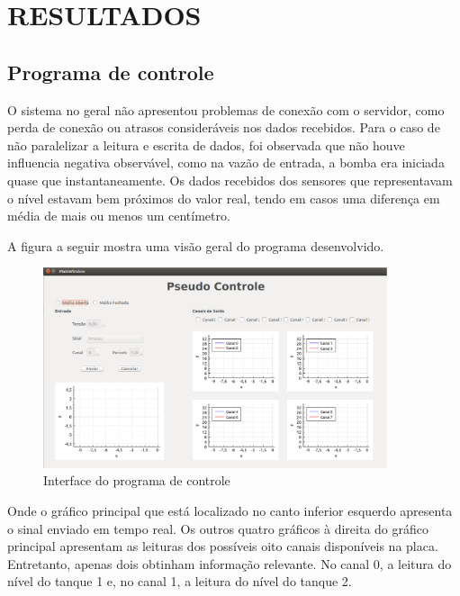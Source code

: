 \documentclass[a4paper,12pt]{article}
\begin{document}
\newpage


\thispagestyle{main}

\section{RESULTADOS}

\hspace{4ex}

\subsection{Programa de controle}
O sistema no geral não apresentou problemas de conexão com o servidor, como perda de conexão ou atrasos consideráveis nos dados recebidos. Para o caso de não paralelizar a leitura e escrita de dados, foi observada que não houve influencia negativa observável, como na vazão de entrada, a bomba era iniciada quase que instantaneamente. Os dados recebidos dos sensores que representavam o nível estavam bem próximos do valor real, tendo em casos uma diferença em média de mais ou menos um centímetro. 

A figura a seguir mostra uma visão geral do programa desenvolvido.

\begin{figure}[!h]
\centering
\includegraphics[width=0.9\textwidth]{prog-geral.eps}
\caption{Interface do programa de controle}
\label{Rotulo}
\end{figure}
\hspace{4ex}
Onde o gráfico principal que está localizado no canto inferior esquerdo apresenta o sinal enviado em tempo real. Os outros quatro gráficos à direita do gráfico principal apresentam as leituras dos possíveis oito canais disponíveis na placa. Entretanto, apenas dois obtinham informação relevante. No canal 0, a leitura do nível do tanque 1 e, no canal 1, a leitura do nível do tanque 2.
\end{document}
